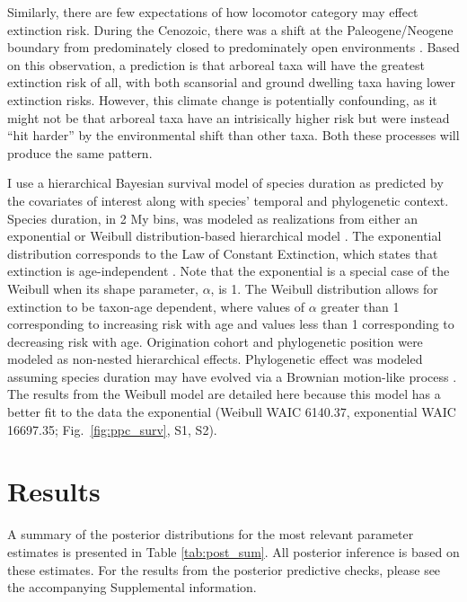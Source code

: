 \documentclass{pnastwo}
\begin{document}
\begin{article}
Similarly, there are few expectations of how locomotor category may effect extinction risk. During the Cenozoic, there was a shift at the Paleogene/Neogene boundary from predominately closed to predominately open environments \cite{Blois2009,Janis1993a}. Based on this observation, a prediction is that arboreal taxa will have the greatest extinction risk of all, with both scansorial and ground dwelling taxa having lower extinction risks. However, this climate change is potentially confounding, as it might not be that arboreal taxa have an intrisically higher risk but were instead ``hit harder'' by the environmental shift than other taxa. Both these processes will produce the same pattern.

I use a hierarchical Bayesian survival model of species duration as predicted by the covariates of interest along with species' temporal and phylogenetic context. Species duration, in 2 My bins, was modeled as realizations from either an exponential or Weibull distribution-based hierarchical model \cite{Gelman2013d}. The exponential distribution corresponds to the Law of Constant Extinction, which states that extinction is age-independent \cite{VanValen1973}. Note that the exponential is a special case of the Weibull when its shape parameter, $\alpha$, is 1. The Weibull distribution allows for extinction to be taxon-age dependent, where values of $\alpha$ greater than 1 corresponding to increasing risk with age and values less than 1 corresponding to decreasing risk with age. Origination cohort and phylogenetic position were modeled as non-nested hierarchical effects. Phylogenetic effect was modeled assuming species duration may have evolved via a Brownian motion-like process \cite{Lynch1991,Housworth2004}. The results from the Weibull model are detailed here because this model has a better fit to the data the exponential (Weibull WAIC 6140.37, exponential WAIC 16697.35; Fig.~\ref{fig:ppc_surv}, S1, S2).


\section{Results}
A summary of the posterior distributions for the most relevant parameter estimates is presented in Table \ref{tab:post_sum}. All posterior inference is based on these estimates. For the results from the posterior predictive checks, please see the accompanying Supplemental information.


\end{article}
\end{document}
